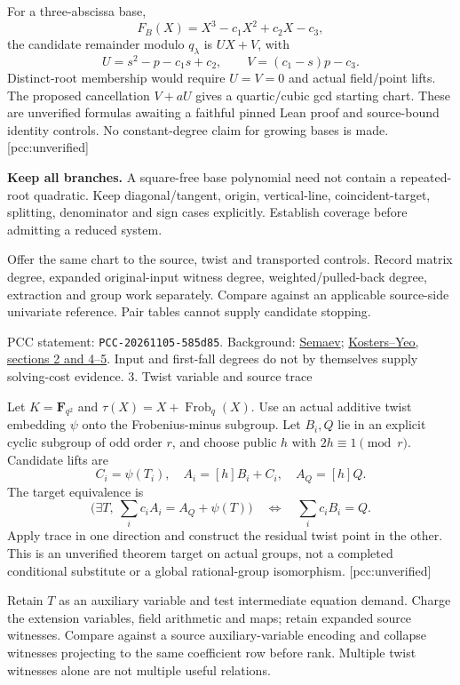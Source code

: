 \documentclass[11pt]{article}
\begin{document}
For a three-abscissa base,
\[
 F_B(X)=X^3-c_1X^2+c_2X-c_3,
\]
the candidate remainder modulo $q_\lambda$ is $UX+V$, with
\[
 U=s^2-p-c_1s+c_2,\qquad V=(c_1-s)p-c_3.
\]
Distinct-root membership would require $U=V=0$ and actual field/point lifts.
The proposed cancellation $V+aU$ gives a quartic/cubic gcd starting chart.
These are unverified formulas awaiting a faithful pinned Lean proof and
source-bound identity controls. No constant-degree claim for growing bases
is made. [pcc:unverified]

\textbf{Keep all branches.} A square-free base polynomial need not contain
a repeated-root quadratic. Keep diagonal/tangent, origin, vertical-line,
coincident-target, splitting, denominator and sign cases explicitly.
Establish coverage before admitting a reduced system.

Offer the same chart to the source, twist and transported controls. Record
matrix degree, expanded original-input witness degree, weighted/pulled-back
degree, extraction and group work separately. Compare against an applicable
source-side univariate reference. Pair tables cannot supply candidate stopping.

\small PCC statement: \texttt{PCC-20261105-585d85}. Background:
\href{https://eprint.iacr.org/2004/031}{Semaev};
\href{https://arxiv.org/pdf/1503.08001}{Kosters--Yeo, sections 2 and 4--5}.
Input and first-fall degrees do not by themselves supply solving-cost evidence.
\clearpage
{\LARGE 3. Twist variable and source trace}

Let $K=\mathbf F_{q^2}$ and $\tau(X)=X+\operatorname{Frob}_q(X)$.
Use an actual additive twist embedding $\psi$ onto the Frobenius-minus subgroup.
Let $B_i,Q$ lie in an explicit cyclic subgroup of odd order $r$, and choose
public $h$ with $2h\equiv1\pmod r$. Candidate lifts are
\[
 C_i=\psi(T_i),\quad A_i=[h]B_i+C_i,\quad A_Q=[h]Q.
\]
The target equivalence is
\[
 \bigl(\exists T,\ \sum_i c_iA_i=A_Q+\psi(T)\bigr)
 \quad\Longleftrightarrow\quad \sum_i c_iB_i=Q.
\]
Apply trace in one direction and construct the residual twist point in the
other. This is an unverified theorem target on actual groups, not a completed
conditional substitute or a global rational-group isomorphism. [pcc:unverified]

Retain $T$ as an auxiliary variable and test intermediate equation demand.
Charge the extension variables, field arithmetic and maps; retain expanded
source witnesses. Compare against a source auxiliary-variable encoding and
collapse witnesses projecting to the same coefficient row before rank.
Multiple twist witnesses alone are not multiple useful relations.
\end{document}
